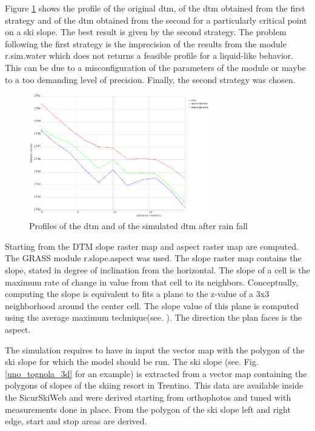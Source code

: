\documentclass[12pt,a4paper,twoside]{book}
\begin{document}
Figure \ref{profile_dtm} shows the profile of the original dtm, of the dtm obtained from the first strategy and of the dtm obtained from the second for a particularly critical point on a ski slope. The best result is given by the second strategy. The problem following the first strategy is the imprecision of the results from the module r.sim.water which does not returns a feasible profile for a liquid-like behavior. This can be due to a misconfiguration of the parameters of the module or maybe to a too demanding level of precision. Finally, the second strategy was chosen.

\begin{figure}[!ht]
  \begin{center}
    \includegraphics[width=0.7\textwidth]{images/profiles_dtm.eps}
    \caption{Profiles of the dtm and of the simulated dtm after rain fall}\label{profile_dtm}
  \end{center}
\end{figure}

Starting from the DTM slope raster map and aspect raster map are computed. The GRASS module r.slope.aspect was used. The slope raster map contains the slope, stated in degree of inclination from the horizontal. The slope of a cell is the maximum rate of change in value from that cell to its neighbors. Conceptually, computing the slope is equivalent to fits a plane to the z-value of a 3x3 neighborhood around the center cell. The slope value of this plane is computed using the average maximum technique(see. \cite{bur2009}). The direction the plan faces is the aspect.

The simulation requires to have in input the vector map with the polygon of the ski slope for which the model should be run. The ski slope (see. Fig.\ref{uno_tognola_3d} for an example) is extracted from a vector map containing the polygons of slopes of the skiing resort in Trentino. This data are available inside the SicurSkiWeb and were derived starting from orthophotos and tuned with measurements done in place. From the polygon of the ski slope left and right edge, start and stop areas are derived.
\end{document}
